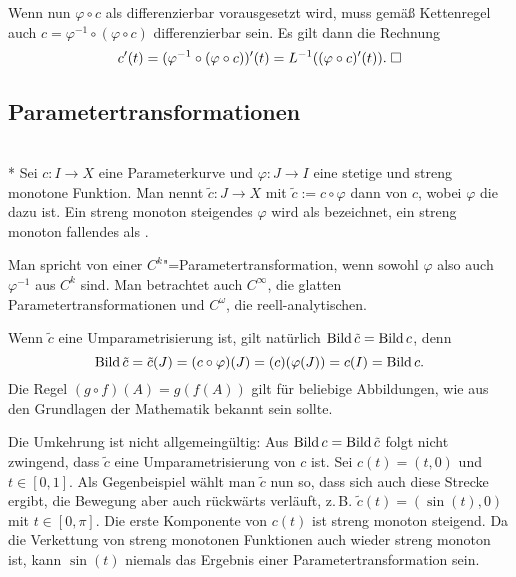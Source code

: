 Wenn nun $\varphi\circ c$ als differenzierbar vorausgesetzt wird,
muss gemäß Kettenregel auch $c=\varphi^{-1}\circ(\varphi\circ c)$
differenzierbar sein. Es gilt dann die Rechnung
\begin{equation}
c'(t) = (\varphi^{-1}\circ(\varphi\circ c))'(t)
= L^{-1}((\varphi\circ c)'(t)).\;\Box
\end{equation}

\pagebreak
\subsection{Parametertransformationen}

\begin{definition}\mbox{}\\*
Sei $c\colon I\to X$ eine Parameterkurve und $\varphi\colon J\to I$
eine stetige und streng monotone Funktion. Man nennt
$\tilde c\colon J\to X$ mit $\tilde c:=c\circ\varphi$ dann
 von $c$, wobei $\varphi$ die
 dazu ist. Ein streng monoton steigendes
$\varphi$ wird als  bezeichnet,
ein streng monoton fallendes als .

Man spricht von einer $C^k$"=Parametertransformation, wenn sowohl
$\varphi$ also auch $\varphi^{-1}$ aus $C^k$ sind. Man betrachtet
auch $C^\infty$, die glatten Parametertransformationen und
$C^\omega$, die reell-analytischen.
\end{definition}

\noindent
Wenn $\tilde c$ eine Umparametrisierung ist, gilt natürlich
$\operatorname{Bild}\tilde c=\operatorname{Bild} c$, denn
\begin{equation}
\operatorname{Bild}\tilde c = \tilde c(J)
= (c\circ\varphi)(J) = (c)(\varphi(J))
= c(I) = \operatorname{Bild} c.
\end{equation}
Die Regel $(g\circ f)(A)=g(f(A))$ gilt für beliebige Abbildungen,
wie aus den Grundlagen der Mathematik bekannt sein sollte.

Die Umkehrung ist nicht allgemeingültig: Aus
$\operatorname{Bild} c=\operatorname{Bild}\tilde c$ folgt nicht zwingend, dass
$\tilde c$ eine Umparametrisierung von $c$ ist. Sei
$c(t)=(t,0)$ und $t\in[0,1]$. Als Gegenbeispiel wählt man
$\tilde c$ nun so, dass sich auch diese Strecke ergibt, die
Bewegung aber auch rückwärts verläuft, z.\,B. $\tilde c(t)=(\sin(t),0)$
mit $t\in[0,\pi]$. Die erste Komponente von $c(t)$ ist streng
monoton steigend. Da die Verkettung von streng monotonen Funktionen
auch wieder streng monoton ist, kann $\sin(t)$ niemals das Ergebnis
einer Parametertransformation sein.

